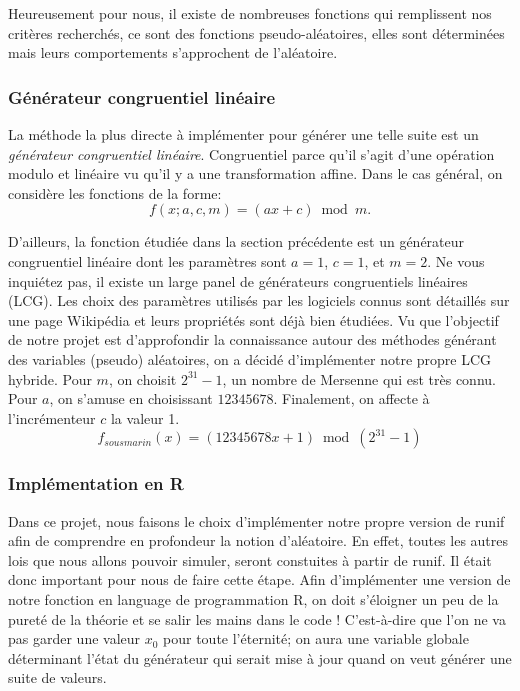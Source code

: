 \documentclass[10pt]{article} %
\begin{document}
Heureusement pour nous, il existe de nombreuses fonctions
qui remplissent nos critères recherchés, ce sont des fonctions pseudo-aléatoires, elles sont déterminées mais leurs comportements s'approchent de l'aléatoire.

\subsubsection{Générateur congruentiel linéaire}

La méthode la plus directe à implémenter pour générer une telle suite est un \textit{générateur congruentiel linéaire}. Congruentiel parce qu'il s'agit d'une opération modulo et
linéaire vu qu'il y a une transformation affine. Dans le cas général, on considère les fonctions de la forme:
$$
    f(x; a, c, m) = (ax + c) \bmod m.
$$

D'ailleurs, la fonction étudiée dans la section précédente est un générateur congruentiel linéaire dont les paramètres sont $a = 1$, $c = 1$, et $m = 2$. Ne vous inquiétez pas, il existe un large panel de
générateurs congruentiels linéaires (LCG). Les choix des paramètres utilisés par les logiciels connus sont détaillés sur une page Wikipédia et leurs propriétés sont déjà
bien étudiées. Vu que l'objectif de notre projet est d'approfondir la connaissance autour des méthodes générant des variables (pseudo) aléatoires, on a décidé d'implémenter notre propre LCG hybride.
Pour $m$, on choisit $2^{31} - 1$, un nombre de Mersenne qui est très connu. Pour $a$, on s'amuse en choisissant $12345678$. Finalement, on affecte à l'incrémenteur $c$ la valeur 1.
$$
    f_{sousmarin}(x) = (12345678x + 1) \bmod (2^{31} - 1)
$$


\subsubsection{Implémentation en R}
Dans ce projet, nous faisons le choix d'implémenter notre propre version de runif afin de comprendre en profondeur la notion d'aléatoire. En effet, toutes les autres lois que nous allons pouvoir simuler, seront constuites à partir de runif. Il était donc important pour nous de faire cette étape. Afin d'implémenter une version de notre fonction en language de programmation R, on doit s'éloigner un peu de la pureté de la théorie et se salir les mains dans le code ! C'est-à-dire que l'on ne va pas garder une valeur $x_0$
pour toute l'éternité; on aura une variable globale déterminant l'état du générateur qui serait mise à jour quand on veut générer une suite de valeurs.
\end{document}
